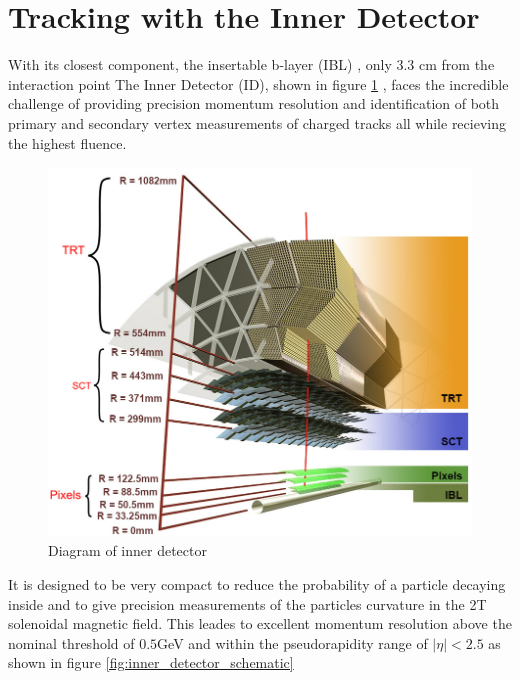 \section{Tracking with the Inner Detector} \label{sec:atlas:tracking}

With its closest component, the insertable b-layer (IBL)
\cite{Potamianos:2209070}, only 3.3 cm from the interaction point The Inner
Detector (ID), shown in figure \ref{fig:inner_detector_diagram}
\cite{ATLAS-TDR-4,ATLAS-TDR-5}, faces the incredible challenge of providing
precision momentum resolution and identification of both primary and secondary
vertex measurements of charged tracks all while recieving the highest fluence.

\begin{figure}[!htbp]
  \begin{center}
    \includegraphics[width=0.8\linewidth]{figures/atlas/inner_detector_diagram}
    \caption{ \cite{Potamianos:2209070} Diagram of inner detector}
    \label{fig:inner_detector_diagram}
  \end{center}
\end{figure}

It is designed to be very compact to reduce the probability of a particle
decaying inside and to give precision measurements of the particles curvature in
the 2T solenoidal magnetic field. This leades to excellent momentum resolution
above the nominal \pT threshold of $0.5$GeV and within the pseudorapidity range
of $|\eta| < 2.5$ as shown in figure \ref{fig:inner_detector_schematic}

